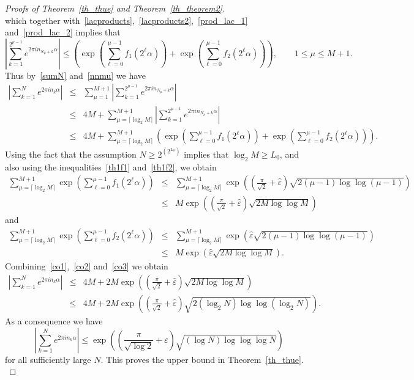 \documentclass[12pt]{amsart}
\newcommand {\ve} {\varepsilon}
\begin{document}
\begin{proof}[Proofs of Theorem~\ref{th_thue} and Theorem~\ref{th_theorem2}]
\begin{equation}
\end{equation}
which together with~\eqref{lacproducts},~\eqref{lacproducts2},~\eqref{prod_lac_1} and~\eqref{prod_lac_2} implies that
$$
\left|\sum_{k= 1}^{2^{\mu-1}} e^{2 \pi i n_{N_\mu+k} \alpha}\right| \leq \left(\exp \left(\sum_{\ell=0}^{\mu-1} f_1(2^\ell \alpha) \right) + \exp \left(\sum_{\ell=0}^{\mu-1} f_2(2^\ell \alpha) \right) \right), \qquad 1 \leq \mu \leq M+1.
$$
Thus by~\eqref{sumN} and~\eqref{nnmu} we have
\begin{eqnarray}
\left|\sum_{k=1}^N e^{2 \pi i n_k \alpha}\right| & \leq & \sum_{\mu=1}^{M+1}  \left|\sum_{k= 1}^{2^{\mu-1}} e^{2 \pi i n_{N_\mu+k} \alpha}\right| \label{continue}\\
& \leq & 4 M + \sum_{\mu=\lceil \log_2 M \rceil}^{M+1}  \left|\sum_{k= 1}^{2^{\mu-1}} e^{2 \pi i n_{N_\mu+k} \alpha}\right| \nonumber\\
& \leq & 4 M + \sum_{\mu=\lceil \log_2 M \rceil}^{M+1}  \left(\exp \left(\sum_{\ell=0}^{\mu-1} f_1(2^\ell \alpha) \right) + \exp \left(\sum_{\ell=0}^{\mu-1} f_2(2^\ell \alpha) \right) \right). \label{co1}
\end{eqnarray}
Using the fact that the assumption $N \geq 2^{(2^{L_0})}$ implies that $\log_2 M \geq L_0$, and also using the inequalities~\eqref{th1f1} and~\eqref{th1f2}, we obtain
\begin{eqnarray*}
\sum_{\mu=\lceil \log_2 M \rceil}^{M+1}  \exp \left(\sum_{\ell=0}^{\mu-1} f_1(2^\ell \alpha) \right) & \leq & \sum_{\mu=\lceil \log_2 M \rceil}^{M+1}  \exp \left(\left(\frac{\pi}{\sqrt{2}}+\hat{\ve} \right)\sqrt{2 (\mu-1) \log \log (\mu-1)} \right) \\
& \leq & M \exp \left(\left(\frac{\pi}{\sqrt{2}}+\hat{\ve} \right)\sqrt{2 M \log \log M} \right) \label{co2}
\end{eqnarray*}
and
\begin{eqnarray*}
\sum_{\mu=\lceil \log_2 M \rceil}^{M+1}  \exp \left(\sum_{\ell=0}^{\mu-1} f_2(2^\ell \alpha) \right) & \leq & \sum_{\mu=\lceil \log_2 M \rceil}^{M+1}   \exp \left(\hat{\ve} \sqrt{2 (\mu-1) \log \log (\mu-1)} \right) \\
& \leq & M \exp \left(\hat{\ve} \sqrt{2 M \log \log M} \right). \label{co3}
\end{eqnarray*}
Combining~\eqref{co1},~\eqref{co2} and~\eqref{co3} we obtain 
\begin{eqnarray*}
\left|\sum_{k=1}^N e^{2 \pi i n_k \alpha}\right| & \leq & 4M + 2M \exp \left(\left(\frac{\pi}{\sqrt{2}}+\hat{\ve} \right)\sqrt{2 M \log \log M} \right) \\
& \leq & 4M + 2M \exp \left(\left(\frac{\pi}{\sqrt{2}}+\hat{\ve} \right)\sqrt{2 (\log_2 N) \log \log (\log_2 N)} \right).
\end{eqnarray*}
As a consequence we have
$$
\left|\sum_{k=1}^N e^{2 \pi i n_k \alpha}\right| \leq \exp \left(\left(\frac{\pi}{\sqrt{\log 2}} +\ve \right)\sqrt{(\log N) \log \log \log N} \right)
$$
for all sufficiently large $N$. This proves the upper bound in Theorem~\ref{th_thue}.\\



\end{proof}
\end{document}
